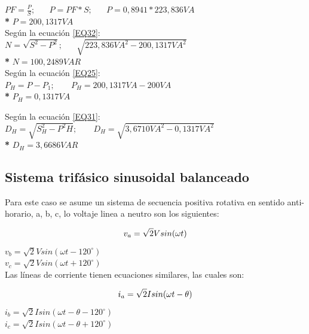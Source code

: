 $PF= \frac{P}{S}; \;\;\;\;\;\; P = PF * S; \;\;\;\;\;\; P = 0,8941 * 223,836 VA$\\

\textbf{* } $P = 200,1317VA$ \\

Según la ecuación \ref{EQ32}: \\

$N=\sqrt{S^2-P^2}; \;\;\;\;\;\; \sqrt{223,836VA^2-200,1317VA^2}$\\

\textbf{* }$N = 100,2489 VAR$\\

Según la ecuación \ref{EQ25}: \\

$P_{H} = P - P_{1}; \;\;\;\;\;\;\; P_{H} = 200,1317VA - 200VA$\\

\textbf{* }$P_{H} = 0,1317VA$

Según la ecuación \ref{EQ31}: \\

$D_{H}=\sqrt{S^2_{H}-P^2{H}}; \;\;\;\;\;\;\; D_{H} = \sqrt{3,6710VA^2 - 0,1317VA^2}$\\

\textbf{* }$D_{H} = 3,6686VAR$

\subsection{Sistema trifásico sinusoidal balanceado }

Para este caso se asume un sistema de secuencia positiva rotativa en sentido anti-horario, a, b, c, lo voltaje linea a neutro son los siguientes:

\begin{equation}\label{EQ35}
v_{a}=\sqrt{2}V sin(\omega t)\\
\end{equation} 
$v_{b}=\sqrt{2}V sin(\omega t-120^{\circ})$\\
$v_{c}=\sqrt{2}V sin(\omega t+120^{\circ})$\\

Las líneas de corriente tienen ecuaciones similares, las cuales son:

\begin{equation}\label{EQ36}
i_{a}=\sqrt{2}I sin(\omega t-\theta)\\
\end{equation} 
$i_{b}=\sqrt{2}I sin(\omega t-\theta -120^{\circ})$\\
$i_{c}=\sqrt{2}I sin(\omega t-\theta +120^{\circ})$\\

